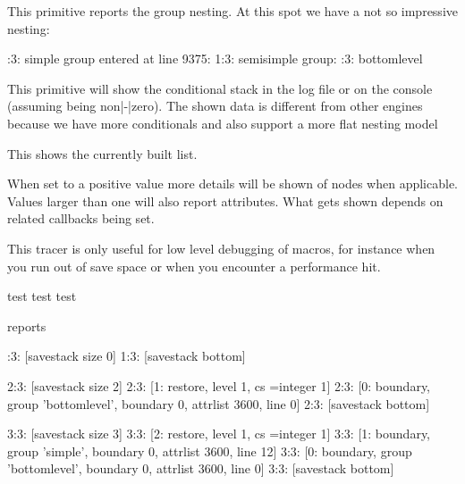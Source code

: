 \startoldprimitive[title={\prm {showgroups}}]

This primitive reports the group nesting. At this spot we have a not so
impressive nesting:

:3: simple group entered at line 9375:
1:3: semisimple group: :3: bottomlevel
\stoptyping

\stopoldprimitive

\startoldprimitive[title={\prm {showifs}}]

This primitive will show the conditional stack in the log file or on the console
(assuming  being non|-|zero). The shown data is different
from other engines because we have more conditionals and also support a more flat
nesting model

\stopoldprimitive

\startoldprimitive[title={\prm {showlists}}]

This shows the currently built list.

\stopoldprimitive

\startoldprimitive[title={\prm {shownodedetails}}]

When set to a positive value more details will be shown of nodes when applicable.
Values larger than one will also report attributes. What gets shown depends on
related callbacks being set.

\stopoldprimitive

\startoldprimitive[title={\prm {showstack}}]

This tracer is only useful for low level debugging of macros, for instance when
you run out of save space or when you encounter a performance hit.

\starttyping
  test \showstack
 {test \showstack}
{{test \showstack}}
\stoptyping

reports

:3: [savestack size 0]
1:3: [savestack bottom]

2:3: [savestack size 2]
2:3: [1: restore, level 1, cs \scratchcounter=integer 1]
2:3: [0: boundary, group 'bottomlevel', boundary 0, attrlist 3600, line 0]
2:3: [savestack bottom]

3:3: [savestack size 3]
3:3: [2: restore, level 1, cs \scratchcounter=integer 1]
3:3: [1: boundary, group 'simple', boundary 0, attrlist 3600, line 12]
3:3: [0: boundary, group 'bottomlevel', boundary 0, attrlist 3600, line 0]
3:3: [savestack bottom]
\stoptyping

